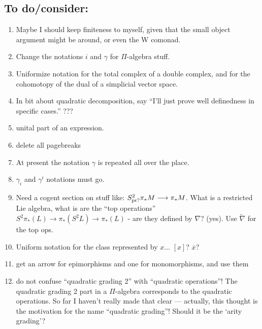 \documentclass[11pt]{amsart}
\theoremstyle{plain}
\theoremstyle{definition}
\renewcommand{\to}{\longrightarrow}
\newcommand{\squishlist}{
  \setlength{\itemsep}{.5pt}
  \setlength{\parskip}{0pt}
  \setlength{\parsep}{0pt}}
\newcommand{\calK}{\mathcal{K}}
\newcommand{\calw}{\mathcal{W}}
\theoremstyle{plain}
\begin{document}
\begin{todolist}
\section{\textbf{To do/consider:}}
\begin{enumerate}\squishlist
\setlength{\parindent}{.25in}
\item Maybe I should keep finiteness to myself, given that the small object argument might be around, or even the W comonad.
\item Change the notations $i$ and $\gamma$ for $\Pi$-algebra stuff.
\item Uniformize notation for the total complex of a double complex, and for the cohomotopy of the dual of a simplicial vector space.
\item In bit about quadratic decomposition, say ``I'll just prove well definedness in specific cases.'' ???
\item unital part of an expression.
\item delete all pagebreaks
\item At present the notation $\gamma$ is repeated all over the place.
\item $\gamma_i$ and $\gamma^i$ notations must go.
\item Need a cogent section on stuff like: $S^2_\textup{pr?}\pi_*M\to \pi_*M$. What is a restricted Lie algebra, what is are the ``top operations'' $S^2\pi_*(L)\to \pi_*(S^2L)\to \pi_*(L)$ - are they defined by $\nabla$? (yes). Use $\widetilde{\nabla}$ for the top ops.
\item Uniform notation for the class represented by $x$... $[x]$? $\overline{x}$?
\item get an arrow for epimorphisms and one for monomorphisms, and use them
\item do not confuse ``quadratic grading 2'' with ``quadratic operations''! The quadratic grading 2 part in a $\Pi$-algebra corresponds to the quadratic operations. So far I haven't really made that clear --- actually, this thought is the motivation for the name ``quadratic grading''! Should it be the `arity grading'?

\end{enumerate}
\end{todolist}
\end{document}
